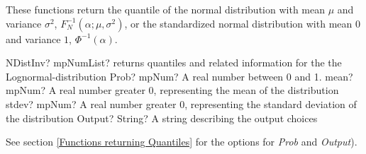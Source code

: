 These functions return the quantile of the normal distribution with  mean $\mu$ and variance $\sigma^2$, $F_N^{-1}(\alpha; \mu, \sigma^2)$, or the standardized normal distribution with mean $0$ and variance $1$, $\Phi^{-1}(\alpha)$.

\vspace{0.3cm}
\begin{mpFunctionsExtract}
	\mpFunctionFour
	{NDistInv? mpNumList? returns quantiles and related information for the the Lognormal-distribution}
	{Prob? mpNum? A real number between 0 and 1.}
	{mean? mpNum? A real number greater 0, representing the mean of the distribution}
	{stdev? mpNum? A real number greater 0, representing the standard deviation of the distribution}
	{Output? String? A string describing the output choices}
\end{mpFunctionsExtract}

See section \ref{Functions returning Quantiles} for the options for  {\itshape\sffamily Prob} and {\itshape\sffamily Output}). 


%
%
%


%


